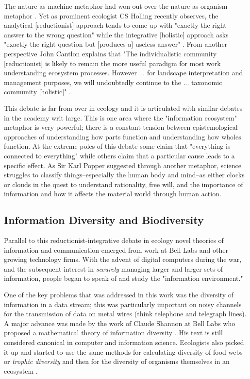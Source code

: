 The nature as machine metaphor had won out over the nature as organism metaphor \citep{hagen_1992}. Yet as prominent ecologist CS Holling recently observes, the analytical [reductionist] approach tends to come up with "exactly the right answer to the wrong question" while the integrative [holistic] approach asks "exactly the right question but [produces a] useless answer" \citep[][p. 3]{holling_1998}. From another perspective John Cantlon explains that "The individualistic community [reductionist] is likely to remain the more useful paradigm for most work understanding ecosystem processes. However ... for landscape interpretation and management purposes, we will undoubtedly continue to the ... taxonomic community [holistic]" \citep[Cantlon 1996, cited in ][p. 241]{barbour_1996}.

This debate is far from over in ecology and it is articulated with similar debates in the academy writ large. This is one area where the "information ecosystem" metaphor is very powerful; there is a constant tension between epistemological approaches of understanding how parts function and understanding how wholes function. At the extreme poles of this debate some claim that "everything is connected to everything" \citep{commoner_1971} while others claim that a particular cause leads to a specific effect. As Sir Karl Popper suggested through another metaphor, science struggles to classify things--especially the human body and mind--as either clocks or clouds in the quest to understand rationality, free will, and the importance of information and how it affects the material world through human action. 

\subsection{Information Diversity and Biodiversity}

Parallel to this reductionist-integrative debate in ecology novel theories of information and communication emerged from work at Bell Labs and other growing technology firms. With the advent of digital computers during the war, and the subsequent interest in \textit{securely} managing larger and larger sets of information, people began to speak of and study the "information environment." 

One of the key problems that was addressed in this work was the diversity of information in a data stream; this was particularly important on noisy channels for the transmission of data on metal wires (think telephone and telegraph lines). A major advance was made by the work of Claude Shannon at Bell Labs who proposed a mathematical theory of information diversity \citep{shannon_1948}. His text is still considered canonical in computer and information science. Ecologists also picked it up and started to use the same methods for calculating diversity of food webs or \textit{trophic diversity} \citep{macarthur_1955} and then for the diversity of organisms themselves in an ecosystem \citep{margalef_1957}. 

